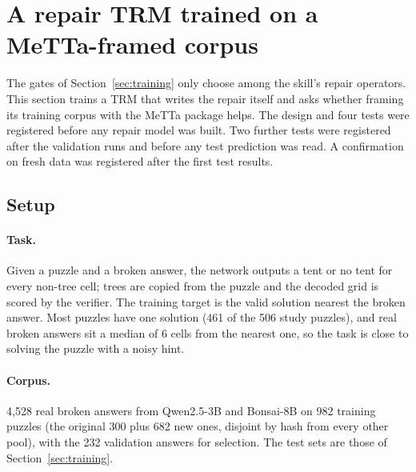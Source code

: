 \documentclass[11pt]{article}
\begin{document}
\section{A repair TRM trained on a MeTTa-framed corpus}
\label{sec:repair}

The gates of Section~\ref{sec:training} only choose among the skill's repair operators. This section trains a TRM that writes the repair itself and asks whether framing its training corpus with the MeTTa package helps. The design and four tests were registered before any repair model was built. Two further tests were registered after the validation runs and before any test prediction was read. A confirmation on fresh data was registered after the first test results.

\subsection{Setup}

\paragraph{Task.} Given a puzzle and a broken answer, the network outputs a tent or no tent for every non-tree cell; trees are copied from the puzzle and the decoded grid is scored by the verifier. The training target is the valid solution nearest the broken answer. Most puzzles have one solution (461 of the 506 study puzzles), and real broken answers sit a median of 6 cells from the nearest one, so the task is close to solving the puzzle with a noisy hint.

\paragraph{Corpus.} 4{,}528 real broken answers from Qwen2.5-3B and Bonsai-8B on 982 training puzzles (the original 300 plus 682 new ones, disjoint by hash from every other pool), with the 232 validation answers for selection. The test sets are those of Section~\ref{sec:training}.
\end{document}
